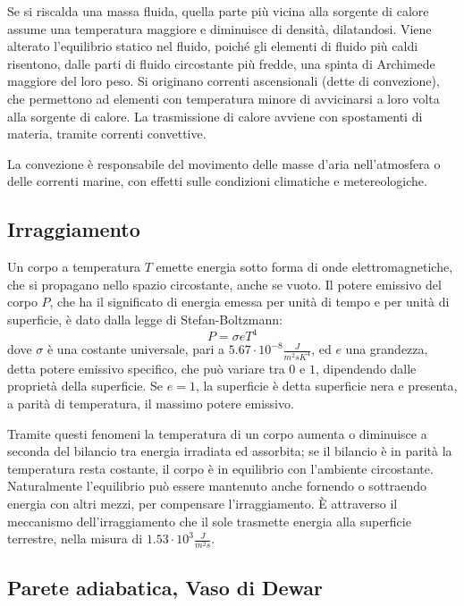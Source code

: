 \documentclass[class=book, crop=false, oneside, 12pt]{standalone}
\begin{document}
Se si riscalda una massa fluida, quella parte più vicina alla sorgente di calore assume una temperatura maggiore e diminuisce di densità, dilatandosi. 
Viene alterato l'equilibrio statico nel fluido, poiché gli elementi di fluido più caldi risentono, dalle parti di fluido circostante più fredde, una spinta di Archimede maggiore del loro peso. 
Si originano correnti ascensionali (dette di convezione), che permettono ad elementi con temperatura minore di avvicinarsi a loro volta alla sorgente di calore. 
La trasmissione di calore avviene con spostamenti di materia, tramite correnti convettive. 

La convezione è responsabile del movimento delle masse d'aria nell'atmosfera o delle correnti marine, con effetti sulle condizioni climatiche e metereologiche.

\subsection{Irraggiamento}

Un corpo a temperatura \(T\) emette energia sotto forma di onde elettromagnetiche, che si propagano nello spazio circostante, anche se vuoto. 
Il potere emissivo del corpo \(P\), che ha il significato di energia emessa per unità di tempo e per unità di superficie, è dato dalla legge di Stefan-Boltzmann: 
\begin{equation}
    P = \sigma e T^{4}
\end{equation}
dove \(\sigma\) è una costante universale, pari a  \(5.67 \cdot 10^{-8} \frac{J}{m^2 s K^4}\), ed \(e\) una grandezza, detta potere emissivo specifico, che può variare tra \(0\) e \(1\), dipendendo dalle proprietà della superficie. 
Se \(e = 1\), la superficie è detta superficie nera e presenta, a parità di temperatura, il massimo potere emissivo. 

Tramite questi fenomeni la temperatura di un corpo aumenta o diminuisce a seconda del bilancio tra energia irradiata ed assorbita; se il bilancio è in parità la temperatura resta costante, il corpo è in equilibrio con l'ambiente circostante. 
Naturalmente l'equilibrio può essere mantenuto anche fornendo o sottraendo energia con altri mezzi, per compensare l'irraggiamento. 
È attraverso il meccanismo dell'irraggiamento che il sole trasmette energia alla superficie terrestre, nella misura di \(1.53 \cdot 10^3 \frac{J}{m^2 s}\).

\subsection{Parete adiabatica, Vaso di Dewar}
\end{document}
